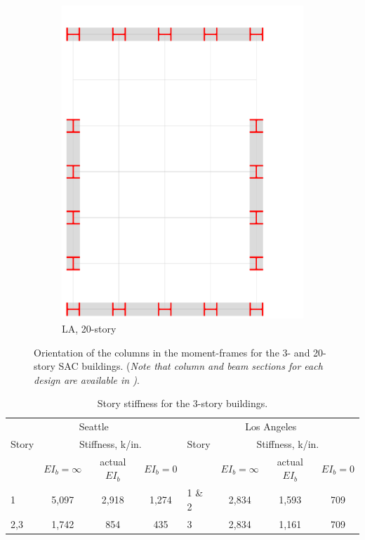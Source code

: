 \documentclass[onecolumn, fleqn]{article}
\begin{document}
\begin{figure}[H]
\begin{subfigure}[b]{0.24\linewidth}
		\centering \includegraphics[page=4,trim=0mm 0mm 90mm 100mm,clip,scale=0.2]{moment_frames.pdf}
		\caption{LA, 20-story}
	\end{subfigure}
	\caption{Orientation of the columns in the moment-frames for the 3- and 20-story SAC buildings. (\textit{Note that column and beam sections for each design are available in \citet{FEMA335c2000})}.}
	\label{fig:cols_orientation}
\end{figure}


\begin{table}[H]
	\centering \caption{Story stiffness for the 3-story buildings.}
	\label{tab:stiffness_3LASE}
	\begin{tabular}{lccclccc}
	\toprule
	\multicolumn{4}{c}{Seattle}											&	\multicolumn{4}{c}{Los Angeles}	\\ \cmidrule(rl){1-4} \cmidrule(rl){5-8}
	Story	& \multicolumn{3}{c}{Stiffness, k/in.}						&	Story	& \multicolumn{3}{c}{Stiffness, k/in.}	\\ \cmidrule(rl){2-4}\cmidrule(rl){6-8}
			& $EI_b = \infty$	& actual $EI_b$		& $EI_b = 0$		&			& $EI_b = \infty$	& actual $EI_b$		& $EI_b = 0$		\\ \cmidrule(rl){1-4} \cmidrule(rl){5-8}
	1		& 5,097				& 2,918				& 1,274				& 1 \& 2	& 2,834				& 1,593				& 709				\\
	2,3		& 1,742				& 854				& 435				& 3			& 2,834				& 1,161				& 709				\\ \bottomrule
	\end{tabular}
\end{table}
\end{document}
